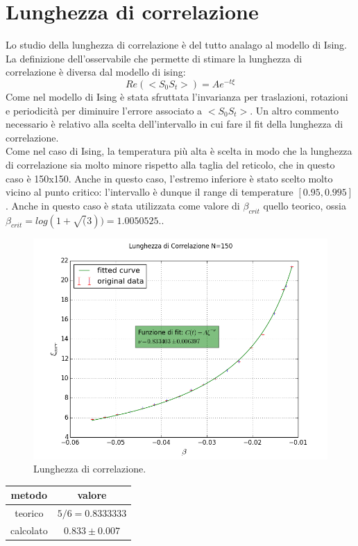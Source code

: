 \section{Lunghezza di correlazione}
Lo studio della lunghezza di correlazione è del tutto analago al modello di Ising.\\
La definizione dell'osservabile che permette di stimare la lunghezza di correlazione è diversa dal modello di ising:
$$
	Re(<S_0 S_t>) = A e^{-t \xi}
$$
Come nel modello di Ising è stata sfruttata l'invarianza per traslazioni, rotazioni e periodicità per diminuire l'errore associato a $<S_0 S_t>$.
Un altro commento necessario è relativo alla scelta dell'intervallo in cui fare il fit della lunghezza di correlazione.\\
Come nel caso di Ising, la temperatura più alta è scelta in modo che la lunghezza di correlazione sia molto minore rispetto alla taglia del reticolo, che in questo caso è 150x150. Anche in questo caso, l'estremo inferiore è stato scelto molto vicino al punto critico: l'intervallo è dunque il range di temperature $[0.95,0.995]$.
Anche in questo caso è stata utilizzata come valore di $\beta_{crit}$ quello teorico, ossia
$\beta_{crit} = log(1+\sqrt(3)) = 1.0050525..$
\begin{center}
\begin{figure}[h]
\centering
 	\includegraphics[scale=0.55]{potts/corr150.png}
 	\caption{Lunghezza di correlazione.}
\end{figure}
\end{center}

\begin{center}
\begin{tabular}{c c }

	\toprule
	metodo & valore \\
	\midrule
	teorico & $ 5/6 = 0.8333333 $ \\
	calcolato & $ 0.833 \pm 0.007 $\\

\end{tabular}

\end{center}


